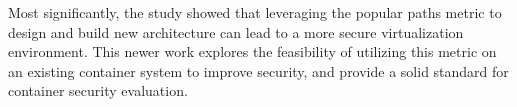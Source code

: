 Most significantly, the study \cite{Lock-in-Pop} showed that leveraging the popular paths metric to design and build new architecture can lead to a more secure virtualization environment. 
This newer work explores the feasibility of utilizing this metric on an existing container system to improve security, and provide a solid standard for container security evaluation. 